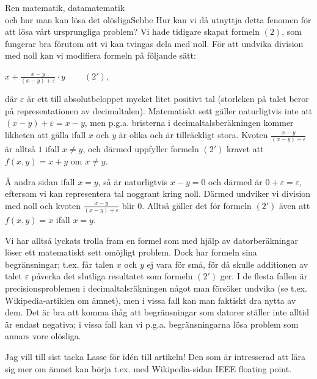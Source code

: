 \documentclass{spektraklet}
\begin{document}
\begin{artikel}{Ren matematik, datamatematik \\ och hur man kan lösa det olösliga}{Sebbe}
Hur kan vi då utnyttja detta fenomen för att lösa vårt ursprungliga problem? Vi hade tidigare skapat formeln $ (2)$, som fungerar bra förutom att vi kan tvingas dela med noll. För att undvika division med noll kan vi modifiera formeln på följande sätt:

$ x + \frac{x-y}{(x-y) + \varepsilon} \cdot y \qquad \: (2')$,

där $ \varepsilon$ är ett till absolutbeloppet mycket litet positivt tal (storleken på talet beror på representationen av decimaltalen). Matematiskt sett gäller naturligtvis inte att $ (x-y) + \varepsilon = x-y$, men p.g.a. bristerna i decimaltalsberäkningen kommer likheten att gälla ifall $ x$ och $ y$ är olika och är tillräckligt stora. Kvoten $ \frac{x-y}{(x-y) + \varepsilon}$ är alltså $ 1$ ifall $ x \neq y$, och därmed uppfyller formeln $ (2')$ kravet att $ f(x,y) = x + y$ om $ x \neq y$.

Å andra sidan ifall $ x = y$, så är naturligtvis $ x - y = 0$ och därmed är $ 0 + \varepsilon = \varepsilon$, eftersom vi kan representera tal noggrant kring noll. Därmed undviker vi division med noll och kvoten $ \frac{x-y}{(x-y) + \varepsilon}$ blir 0. Alltså gäller det för formeln $ (2')$ även att $ f(x,y) = x$ ifall $ x = y$.

Vi har alltså lyckats trolla fram en formel som med hjälp av datorberäkningar löser ett matematiskt sett omöjligt problem. Dock har formeln sina begränsningar; t.ex. får talen $ x$ och $ y$ ej vara för små, för då skulle additionen av talet $ \varepsilon$ påverka det slutliga resultatet som formeln $ (2')$ ger. I de flesta fallen är precisionsproblemen i decimaltalsräkningen något man försöker undvika (se t.ex. Wikipedia-artiklen om ämnet), men i vissa fall kan man faktiskt dra nytta av dem. Det är bra att komma ihåg att begränsningar som datorer ställer inte alltid är endast negativa; i vissa fall kan vi p.g.a. begränsningarna lösa problem som annars vore olösliga.

Jag vill till sist tacka Lasse för idén till artikeln! Den som är intresserad att lära sig mer om ämnet kan börja t.ex. med Wikipedia-sidan IEEE floating point.

\end{artikel}
\end{document}
